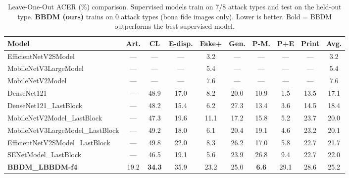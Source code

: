\begin{table}[t]
\centering
\small
\caption{Leave-One-Out ACER (\%) comparison. Supervised models train on 7/8 attack types and test on the held-out type. \textbf{BBDM (ours)} trains on 0 attack types (bona fide images only). Lower is better. Bold = BBDM outperforms the best supervised model.}
\label{tab:loo_acer}
\begin{tabular}{l|ccccccccc}
\toprule
Model & Art. & CL & E-disp. & Fake+ & Gen. & P-M. & P+E & Print & \textbf{Avg.} \\
\midrule
EfficientNetV2SModel & — & — & — & 3.2 & — & — & — & — & 3.2 \\
MobileNetV3LargeModel & — & — & — & 5.4 & — & — & — & — & 5.4 \\
MobileNetV2Model & — & — & — & 7.6 & — & — & — & — & 7.6 \\
DenseNet121 & — & 48.9 & 17.0 & 8.2 & 20.0 & 10.9 & 1.5 & 13.5 & 17.1 \\
DenseNet121_LastBlock & — & 48.2 & 15.4 & 6.2 & 27.3 & 13.4 & 3.6 & 14.5 & 18.4 \\
MobileNetV2Model_LastBlock & — & 47.3 & 19.6 & 11.1 & 17.2 & 15.8 & 5.2 & 23.7 & 20.0 \\
MobileNetV3LargeModel_LastBlock & — & 49.2 & 18.0 & 6.1 & 20.4 & 19.1 & 4.6 & 23.2 & 20.1 \\
EfficientNetV2SModel_LastBlock & — & 49.8 & 22.0 & 8.3 & 26.2 & 17.0 & 5.8 & 22.7 & 21.7 \\
SENetModel_LastBlock & — & 46.5 & 19.1 & 5.6 & 23.9 & 26.8 & 9.4 & 22.7 & 22.0 \\
\midrule
\textbf{BBDM_LBBDM-f4} & 19.2 & \textbf{34.3} & 35.9 & 23.2 & 25.0 & \textbf{6.6} & 29.1 & 28.6 & 25.2 \\
\bottomrule
\end{tabular}
\end{table}